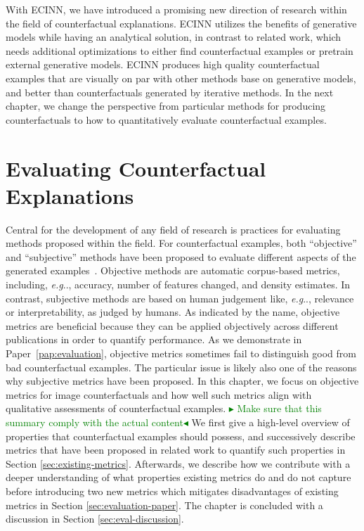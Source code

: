 \documentclass[11pt,a4paper,twoside,openright,final]{memoir}
\makeatletter
\def\ifdraft{\ifdim\overfullrule>\z@
  \expandafter\@firstoftwo\else\expandafter\@secondoftwo\fi}
\newcommand{\frederik}[1]{{
    \ifdraft{
        \textcolor{green}{\textbf{$\blacktriangleright$} #1\textbf{$\blacktriangleleft$}}
    }{}}}
\DeclareRobustCommand\onedot{\futurelet\@let@token\@onedot}
\def\@onedot{\ifx\@let@token.\else.\null\fi\xspace}
\def\eg{\emph{e.g}\onedot} \def\Eg{\emph{E.g}\onedot}
\newcommand*{\paperref}[1]{Paper~\hyperref[#1]{\ref{#1}}}
\makeatother
\begin{document}
With ECINN, we have introduced a promising new direction of research within the field of counterfactual explanations. 
ECINN utilizes the benefits of generative models while having an analytical solution, in contrast to related work, which needs additional optimizations to either find counterfactual examples or pretrain external generative models.
ECINN produces high quality counterfactual examples that are visually on par with other methods base on generative models, and better than counterfactuals generated by iterative methods.
In the next chapter, we change the perspective from particular methods for producing counterfactuals to how to quantitatively evaluate counterfactual examples. 


\chapter{Evaluating Counterfactual Explanations}\label{chap:evaluation}
Central for the development of any field of research is practices for evaluating methods proposed within the field.
For counterfactual examples, both ``objective'' and ``subjective'' methods have been proposed to evaluate different aspects of the generated examples~\cite{Stepin2021}.
Objective methods are automatic corpus-based metrics, including, \eg, accuracy, number of features changed, and density estimates.
In contrast, subjective methods are based on human judgement like, \eg, relevance or interpretability, as judged by humans.
As indicated by the name, objective metrics are beneficial because they can be applied objectively across different publications in order to quantify performance.
As we demonstrate in \paperref{pap:evaluation}, objective metrics sometimes fail to distinguish good from bad counterfactual examples.
The particular issue is likely also one of the reasons why subjective metrics have been proposed.
In this chapter, we focus on objective metrics for image counterfactuals and how well such metrics align with qualitative assessments of counterfactual examples. 
\frederik{Make sure that this summary comply with the actual content} 
We first give a high-level overview of properties that counterfactual examples should possess, and successively describe metrics that have been proposed in related work to quantify such properties in Section \ref{sec:existing-metrics}.
Afterwards, we describe how we contribute with a deeper understanding of what properties existing metrics do and do not capture before introducing two new metrics which mitigates disadvantages of existing metrics in Section \ref{sec:evaluation-paper}.
The chapter is concluded with a discussion in Section \ref{sec:eval-discussion}.
\end{document}
